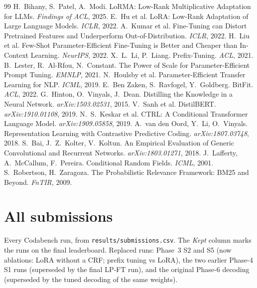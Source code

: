 {\footnotesize
\begin{thebibliography}{99}\setlength{\itemsep}{0pt}
 H.~Bihany, S.~Patel, A.~Modi. LoRMA: Low-Rank Multiplicative Adaptation for LLMs. \emph{Findings of ACL}, 2025.
 E.~Hu et al. LoRA: Low-Rank Adaptation of Large Language Models. \emph{ICLR}, 2022.
 A.~Kumar et al. Fine-Tuning can Distort Pretrained Features and Underperform Out-of-Distribution. \emph{ICLR}, 2022.
 H.~Liu et al. Few-Shot Parameter-Efficient Fine-Tuning is Better and Cheaper than In-Context Learning. \emph{NeurIPS}, 2022.
 X.~L.~Li, P.~Liang. Prefix-Tuning. \emph{ACL}, 2021.
 B.~Lester, R.~Al-Rfou, N.~Constant. The Power of Scale for Parameter-Efficient Prompt Tuning. \emph{EMNLP}, 2021.
 N.~Houlsby et al. Parameter-Efficient Transfer Learning for NLP. \emph{ICML}, 2019.
 E.~Ben Zaken, S.~Ravfogel, Y.~Goldberg. BitFit. \emph{ACL}, 2022.
 G.~Hinton, O.~Vinyals, J.~Dean. Distilling the Knowledge in a Neural Network. \emph{arXiv:1503.02531}, 2015.
 V.~Sanh et al. DistilBERT. \emph{arXiv:1910.01108}, 2019.
 N.~S.~Keskar et al. CTRL: A Conditional Transformer Language Model. \emph{arXiv:1909.05858}, 2019.
 A.~van den Oord, Y.~Li, O.~Vinyals. Representation Learning with Contrastive Predictive Coding. \emph{arXiv:1807.03748}, 2018.
 S.~Bai, J.~Z.~Kolter, V.~Koltun. An Empirical Evaluation of Generic Convolutional and Recurrent Networks. \emph{arXiv:1803.01271}, 2018.
 J.~Lafferty, A.~McCallum, F.~Pereira. Conditional Random Fields. \emph{ICML}, 2001.
 S.~Robertson, H.~Zaragoza. The Probabilistic Relevance Framework: BM25 and Beyond. \emph{FnTIR}, 2009.
\end{thebibliography}}

\onecolumn
\appendix
\section{All submissions}\label{app:subs}
Every Codabench run, from \texttt{results/submissions.csv}. The \emph{Kept} column marks the runs on the final leaderboard. Replaced runs: Phase~3 S2 and S5 (now ablations: LoRA without a CRF; prefix tuning vs LoRA), the two earlier Phase-4 S1 runs (superseded by the final LP-FT run), and the original Phase-6 decoding (superseded by the tuned decoding of the same weights).
{\scriptsize}

